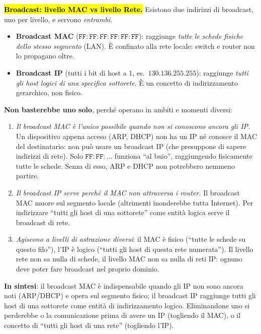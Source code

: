 \documentclass[11pt,a4paper]{report}
\begin{document}
\hl{\textbf{Broadcast: livello MAC vs livello Rete.}} Esistono due indirizzi di
broadcast, uno per livello, e servono \emph{entrambi}.
\begin{itemize}[noitemsep]
\item \textbf{Broadcast MAC} ($\mathtt{FF{:}FF{:}FF{:}FF{:}FF{:}FF}$): raggiunge
\emph{tutte le schede fisiche dello stesso segmento} (LAN). È confinato alla rete
locale: switch e router non lo propagano oltre.
\item \textbf{Broadcast IP} (tutti i bit di host a $1$, es.\ $130.136.255.255$):
raggiunge \emph{tutti gli host logici di una specifica sottorete}. È un concetto
di indirizzamento gerarchico, non fisico.
\end{itemize}
\textbf{Non basterebbe uno solo}, perché operano in ambiti e momenti diversi:
\begin{enumerate}[noitemsep]
\item \emph{Il broadcast MAC è l'unico possibile quando non si conoscono ancora
gli IP.} Un dispositivo appena acceso (ARP, DHCP) non ha un IP né conosce il MAC
del destinatario: non può usare un broadcast IP (che presuppone di sapere
indirizzi di rete). Solo $\mathtt{FF{:}FF{:}\dots}$ funziona ``al buio'',
raggiungendo fisicamente tutte le schede. Senza di esso, ARP e DHCP non potrebbero
nemmeno partire.
\item \emph{Il broadcast IP serve perché il MAC non attraversa i router.} Il
broadcast MAC muore sul segmento locale (altrimenti inonderebbe tutta Internet).
Per indirizzare ``tutti gli host di una sottorete'' come entità logica serve il
broadcast di rete.
\item \emph{Agiscono a livelli di astrazione diversi}: il MAC è fisico (``tutte le
schede su questo filo''), l'IP è logico (``tutti gli host di questa rete
numerata''). Il livello rete non sa nulla di schede, il livello MAC non sa nulla
di reti IP: ognuno deve poter fare broadcast nel proprio dominio.
\end{enumerate}
\textbf{In sintesi}: il broadcast MAC è indispensabile quando gli IP non sono
ancora noti (ARP/DHCP) e opera sul segmento fisico; il broadcast IP raggiunge tutti
gli host di una sottorete come entità di indirizzamento logico. Eliminandone uno si
perderebbe o la comunicazione prima di avere un IP (togliendo il MAC), o il concetto
di ``tutti gli host di una rete'' (togliendo l'IP).
\end{document}
